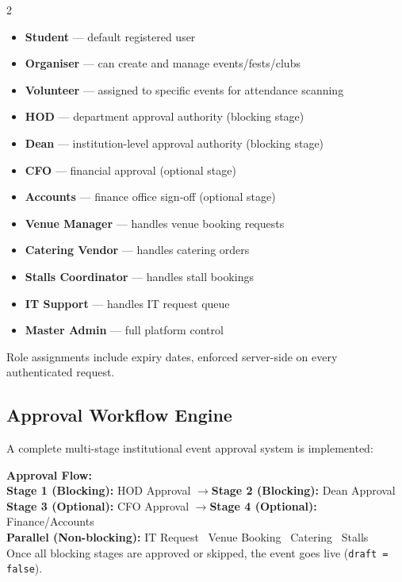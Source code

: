 \documentclass[12pt,a4paper]{article}
\begin{document}
\begin{multicols}{2}
\begin{itemize}[leftmargin=*]
    \item \textbf{Student} — default registered user
    \item \textbf{Organiser} — can create and manage events/fests/clubs
    \item \textbf{Volunteer} — assigned to specific events for attendance scanning
    \item \textbf{HOD} — department approval authority (blocking stage)
    \item \textbf{Dean} — institution-level approval authority (blocking stage)
    \item \textbf{CFO} — financial approval (optional stage)
    \item \textbf{Accounts} — finance office sign-off (optional stage)
    \item \textbf{Venue Manager} — handles venue booking requests
    \item \textbf{Catering Vendor} — handles catering orders
    \item \textbf{Stalls Coordinator} — handles stall bookings
    \item \textbf{IT Support} — handles IT request queue
    \item \textbf{Master Admin} — full platform control
\end{itemize}
\end{multicols}

Role assignments include expiry dates, enforced server-side on every authenticated request.

\subsection{Approval Workflow Engine}

A complete multi-stage institutional event approval system is implemented:

\begin{infobox}
\textbf{Approval Flow:}\\[0.3cm]
\textbf{Stage 1 (Blocking):} HOD Approval \quad$\rightarrow$\quad \textbf{Stage 2 (Blocking):} Dean Approval\\[0.2cm]
\textbf{Stage 3 (Optional):} CFO Approval \quad$\rightarrow$\quad \textbf{Stage 4 (Optional):} Finance/Accounts\\[0.2cm]
\textbf{Parallel (Non-blocking):} IT Request \textbullet\ Venue Booking \textbullet\ Catering \textbullet\ Stalls\\[0.3cm]
Once all blocking stages are approved or skipped, the event goes live (\texttt{draft = false}).
\end{infobox}
\end{document}
